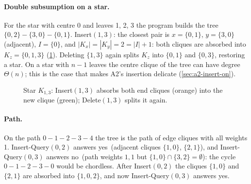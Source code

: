 \documentclass[11pt,a4paper,oneside]{report}
\theoremstyle{plain}
\theoremstyle{definition}
\theoremstyle{remark}
\newcommand{\yes}{\textsf{yes}}
\newcommand{\no}{\textsf{no}}
\newcommand{\op}[1]{\textsf{#1}}
\begin{document}
\paragraph{Double subsumption on a star.} For the star with centre 0 and leaves 1, 2, 3 the
program builds the tree \(\{0,2\}\!-\!\{3,0\}\!-\!\{0,1\}\). \op{Insert}\((1,3)\): the closest
pair is \(x=\{0,1\}\), \(y=\{3,0\}\) (adjacent), \(I=\{0\}\), and \(|K_x|=|K_y|=2=|I|+1\): both
cliques are absorbed into \(K_z=\{0,1,3\}\) (\cref{fig:trace-star}). Deleting \(\{1,3\}\) again
splits \(K_z\) into \(\{0,1\}\) and \(\{0,3\}\), restoring a star. On a star with \(n-1\) leaves
the centre clique of the tree can have degree \(\Theta(n)\); this is the case that makes A2's
insertion delicate (\cref{sec:a2-insert-on}).

\begin{figure}[ht]
\centering
{}
\caption[Double subsumption on a star]{Star \(K_{1,3}\): \op{Insert}\((1,3)\) absorbs both end
cliques (orange) into the new clique (green); \op{Delete}\((1,3)\) splits it again.}
\label{fig:trace-star}
\end{figure}

\paragraph{Path.} On the path \(0\!-\!1\!-\!2\!-\!3\!-\!4\) the tree is the path of edge
cliques with all weights 1. \op{Insert-Query}\((0,2)\) answers \yes\ (adjacent cliques
\(\{1,0\}\), \(\{2,1\}\)), and \op{Insert-Query}\((0,3)\) answers \no\ (path weights \(1,1\) but
\(\{1,0\}\cap\{3,2\}=\emptyset\)): the cycle \(0\!-\!1\!-\!2\!-\!3\!-\!0\) would be chordless.
After \op{Insert}\((0,2)\) the cliques \(\{1,0\}\) and \(\{2,1\}\) are absorbed into
\(\{1,0,2\}\), and now \op{Insert-Query}\((0,3)\) answers \yes.
\end{document}
